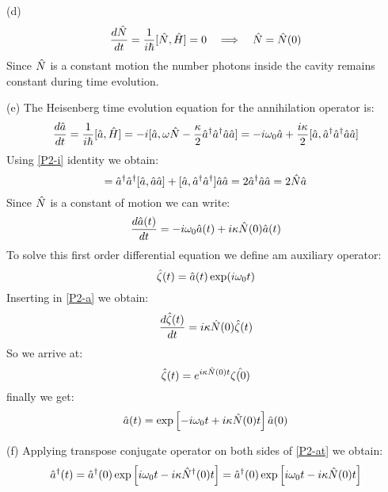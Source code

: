 \begin{homeworkProblem}
\begin{homeworkSection}{(d)}
\begin{equation}
\frac{d\Hat{N}}{dt}=\frac{1}{i\hbar}[\Hat{N},\Hat{H}]=0\quad\Longrightarrow\quad \Hat{N}=\Hat{N}(0)
\end{equation}
Since $\Hat{N}$ is a constant motion the number photons inside the cavity remains constant during time evolution.
\end{homeworkSection}
\begin{homeworkSection}{(e)}
The Heisenberg time evolution equation for the annihilation operator is:
\begin{equation}
\frac{d\Hat{a}}{dt}=\frac{1}{i\hbar}[\Hat{a},\Hat{H}]=-i[\Hat{a},\omega\Hat{N}-\frac{\kappa}{2}\Hat{a}^\dagger\Hat{a}^\dagger\Hat{a}\Hat{a}]=-i\omega_0\Hat{a}+\frac{i\kappa}{2}[\Hat{a},\Hat{a}^\dagger\Hat{a}^\dagger\Hat{a}\Hat{a}]
\end{equation}
Using \eqref{P2-i} identity we obtain:
\begin{equation}
[\A{a},\A{a}^\dagger\A{a}^\dagger\A{a}\A{a}]=\A{a}^\dagger\A{a}^\dagger[\A{a},\A{a}\A{a}]+[\A{a},\A{a}^\dagger\A{a}^\dagger]\A{a}\A{a}=2\A{a}^\dagger\A{a}\A{a}=2\A{N}\A{a}
\end{equation}
Since $\Hat{N}$ is a constant of motion we can write:
\begin{equation}\label{P2-a}
\frac{d\Hat{a}(t)}{dt}=-i\omega_0\Hat{a}(t)+i\kappa\Hat{N}(0)\Hat{a}(t)
\end{equation} 
To solve this first order differential equation we define am auxiliary operator:
\begin{equation}
\Hat{\zeta}(t)=\Hat{a}(t)\exp(i\omega_0 t)
\end{equation}
Inserting in \eqref{P2-a} we obtain:
\begin{equation}
\frac{d\Hat{\zeta}(t)}{dt}=i\kappa \Hat{N}(0)\Hat{\zeta}(t)
\end{equation}
So we arrive at:
\begin{equation}
\Hat{\zeta}(t)=e^{i\kappa\Hat{N}(0)t}\Hat{\zeta(0)}
\end{equation}
finally we get:
\begin{equation}\label{P2-at}
\Hat{a}(t)=\exp\left[-i\omega_0t+i\kappa\Hat{N}(0)t\right]\Hat{a}(0)
\end{equation}
\end{homeworkSection}
\begin{homeworkSection}{(f)}
Applying transpose conjugate operator on both sides of \eqref{P2-at} we obtain:
\begin{equation}
\A{a}^\dagger(t)=\A{a}^\dagger(0)\exp\left[i\omega_0t-i\kappa\A{N}^\dagger(0)t\right]=\A{a}^\dagger(0)\exp\left[i\omega_0t-i\kappa\A{N}(0)t\right]

\end{equation}
\end{homeworkSection}
\end{homeworkProblem}
